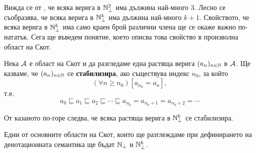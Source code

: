 Вижда се от , че всяка верига в $\mathbb{N}^2_\bot$ има дължина най-много $3$.
Лесно се съобразява, че всяка верига в $\mathbb{N}^k_\bot$ има дължина най-много $k+1$.
Свойството, че всяка верига в $\mathbb{N}^k_\bot$ има само краен брой различни члена
ще се окаже важно по-нататък. Сега ще въведем понятие, което описва това свойство в произволна област на Скот.

Нека $\mathcal{A}$ е област на Скот и да разгледаме една растяща верига $(a_n)_{n\in\mathbb{N}}$ в $\mathcal{A}$.
Ще казваме, че $(a_n)_{n\in \mathbb{N}}$ се {\bf стабилизира}, ако съществува индекс $n_0$, за който
\[(\forall n \geq n_0)[a_{n_0} = a_{n}],\]
т.е.
\[a_0 \sqsubseteq a_1 \sqsubseteq a_2 \sqsubseteq \cdots \sqsubseteq a_{n_0} = a_{n_0+1} = a_{n_0+2} = \cdots\]

От казаното по-горе следва, че всяка растяща верига в $\mathbb{N}^k_\bot$ се стабилизира.

\begin{remark}
  Едни от основните области на Скот, които ще разглеждаме при дефинирането на денотационната семантика
  ще бъдат $\mathbb{N}_\bot$ и $\mathbb{N}^k_\bot$.
\end{remark}


